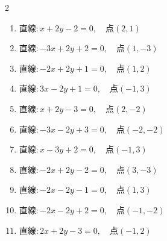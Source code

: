 \begin{multicols}{2}
\begin{enumerate}

  \item $直線:x+2y-2=0,\quad 点 ( 2, 1 )$


  \item $直線:-3x+2y+2=0,\quad 点 ( 1, -3 )$


  \item $直線:-2x+2y+1=0,\quad 点 ( 1, 2 )$


  \item $直線:3x-2y+1=0,\quad 点 ( -1, 3 )$


  \item $直線:x+2y-3=0,\quad 点 ( 2, -2 )$


  \item $直線:-3x-2y+3=0,\quad 点 ( -2, -2 )$


  \item $直線:x-3y+2=0,\quad 点 ( -1, 3 )$


  \item $直線:-2x+2y-2=0,\quad 点 ( 3, -3 )$


\columnbreak %

  \item $直線:-2x-2y-1=0,\quad 点 ( 1, 3 )$


  \item $直線:-2x-2y+2=0,\quad 点 ( -1, -2 )$


  \item $直線:2x+2y-3=0,\quad 点 ( -1, 2 )$



\end{enumerate}
\end{multicols}
